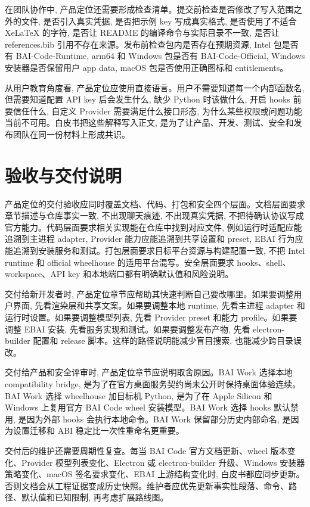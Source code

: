 在团队协作中, 产品定位还需要形成检查清单。提交前检查是否修改了写入范围之外的文件, 是否引入真实凭据, 是否把示例 key 写成真实格式, 是否使用了不适合 XeLaTeX 的字符, 是否让 README 的编译命令与实际目录不一致, 是否让 references.bib 引用不存在来源。发布前检查包内是否存在预期资源, Intel 包是否有 BAI-Code-Runtime, arm64 和 Windows 包是否有 BAI-Code-Official, Windows 安装器是否保留用户 app data, macOS 包是否使用正确图标和 entitlements。

从用户教育角度看, 产品定位应使用直接语言。用户不需要知道每一个内部函数名, 但需要知道配置 API key 后会发生什么, 缺少 Python 时该做什么, 开启 hooks 前要信任什么, 自定义 Provider 需要满足什么接口形态, 为什么某些权限或问题功能当前不可用。白皮书把这些解释写入正文, 是为了让产品、开发、测试、安全和发布团队在同一份材料上形成共识。

\section{验收与交付说明}
产品定位的交付验收应同时覆盖文档、代码、打包和安全四个层面。文档层面要求章节描述与仓库事实一致, 不出现聊天痕迹, 不出现真实凭据, 不把待确认协议写成官方能力。代码层面要求相关实现能在仓库中找到对应文件, 例如运行时适配应能追溯到主进程 adapter, Provider 能力应能追溯到共享设置和 preset, EBAI 行为应能追溯到安装服务和测试。打包层面要求目标平台资源与构建配置一致, 不把 Intel runtime 和 official wheelhouse 的适用平台混写。安全层面要求 hooks、shell、workspace、API key 和本地端口都有明确默认值和风险说明。

交付给新开发者时, 产品定位章节应帮助其快速判断自己要改哪里。如果要调整用户界面, 先看渲染层和共享文案。如果要调整本地 runtime, 先看主进程 adapter 和运行时设置。如果要调整模型列表, 先看 Provider preset 和能力 profile。如果要调整 EBAI 安装, 先看服务实现和测试。如果要调整发布产物, 先看 electron-builder 配置和 release 脚本。这样的路径说明能减少盲目搜索, 也能减少跨目录误改。

交付给产品和安全评审时, 产品定位章节应说明取舍原因。BAI Work 选择本地 compatibility bridge, 是为了在官方桌面服务契约尚未公开时保持桌面体验连续。BAI Work 选择 wheelhouse 加目标机 Python, 是为了在 Apple Silicon 和 Windows 上复用官方 BAI Code wheel 安装模型。BAI Work 选择 hooks 默认禁用, 是因为外部 hooks 会执行本地命令。BAI Work 保留部分历史内部命名, 是因为设置迁移和 ABI 稳定比一次性重命名更重要。

交付后的维护还需要周期性复查。每当 BAI Code 官方文档更新、wheel 版本变化、Provider 模型列表变化、Electron 或 electron-builder 升级、Windows 安装器策略变化、macOS 签名要求变化、EBAI 上游结构变化时, 白皮书都应同步更新。否则文档会从工程证据变成历史快照。维护者应优先更新事实性段落、命令、路径、默认值和已知限制, 再考虑扩展路线图。

